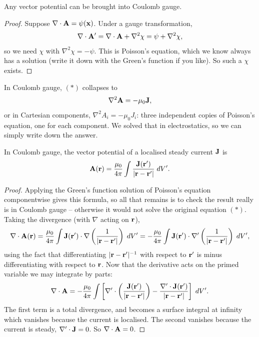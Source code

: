 \documentclass[a4paper]{scrartcl}
\begin{document}
\begin{proposition}
	Any vector potential can be brought into Coulomb gauge.
\end{proposition}
\begin{proof}
	Suppose $\nabla\cdot\mathbf{A} = \psi(\mathbf{x})$. Under a gauge transformation,
	$$
	\nabla\cdot \mathbf{A}' = \nabla\cdot\mathbf{A} + \nabla^2 \chi = \psi + \nabla^2 \chi,
	$$
	so we need $\chi$ with $\nabla^2 \chi = -\psi$. This is Poisson's equation, which we know always has a solution (write it down with the Green's function if you like). So such a $\chi$ exists.
\end{proof}

In Coulomb gauge, $(*)$ collapses to
$$
\nabla^2 \mathbf{A} = -\mu_0 \mathbf{J},
$$
or in Cartesian components, $\nabla^2 A_i = -\mu_0 J_i$: three independent copies of Poisson's equation, one for each component. We solved that in electrostatics, so we can simply write down the answer.

\begin{proposition}
	\label{prop:A-general}
	In Coulomb gauge, the vector potential of a localised steady current $\mathbf{J}$ is
	$$
	\mathbf{A}(\mathbf{r}) = \frac{\mu_0}{4\pi}\int \frac{\mathbf{J}(\mathbf{r}')}{|\mathbf{r}-\mathbf{r}'|}\; d V'.
	$$
\end{proposition}
\begin{proof}
	Applying the Green's function solution of Poisson's equation componentwise gives this formula, so all that remains is to check the result really is in Coulomb gauge -- otherwise it would not solve the original equation $(*)$. Taking the divergence (with $\nabla$ acting on $\mathbf{r}$),
	$$
	\nabla\cdot \mathbf{A}(\mathbf{r}) = \frac{\mu_0}{4\pi}\int \mathbf{J}(\mathbf{r}')\cdot \nabla\left(\frac{1}{|\mathbf{r}-\mathbf{r}'|}\right)\; d V' = -\frac{\mu_0}{4\pi}\int\mathbf{J}(\mathbf{r}')\cdot\nabla'\left(\frac{1}{|\mathbf{r}-\mathbf{r}'|}\right)\; d V',
	$$
	using the fact that differentiating $|\mathbf{r}-\mathbf{r}'|^{-1}$ with respect to $\mathbf{r}'$ is minus differentiating with respect to $\mathbf{r}$. Now that the derivative acts on the primed variable we may integrate by parts:
	$$
	\nabla \cdot \mathbf{A} = -\frac{\mu_0}{4\pi}\int\left[\nabla'\cdot\left(\frac{\mathbf{J}(\mathbf{r}')}{|\mathbf{r}-\mathbf{r}'|}\right) - \frac{\nabla'\cdot \mathbf{J}(\mathbf{r}')}{|\mathbf{r}-\mathbf{r}'|}\right]\; d V'.
	$$
	The first term is a total divergence, and becomes a surface integral at infinity which vanishes because the current is localised. The second vanishes because the current is steady, $\nabla'\cdot \mathbf{J} = 0$. So $\nabla\cdot \mathbf{A} = 0$.
\end{proof}
\end{document}
